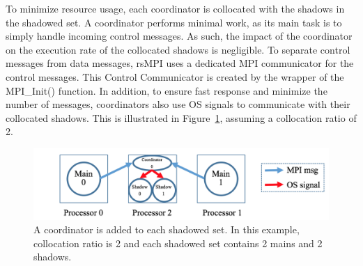 To minimize resource usage, each coordinator is collocated with the shadows in the shadowed set. 
A coordinator performs  minimal work, as its main task is to simply handle incoming control messages.  As such, the impact of the coordinator on the execution rate of the collocated shadows is negligible. To separate control messages from data messages, rsMPI uses a dedicated MPI communicator for the control messages. This Control Communicator is created by the wrapper of the MPI\_Init() function. In addition, to ensure fast response and minimize the number of messages, coordinators also use OS signals to communicate with their collocated shadows. This is illustrated in Figure~\ref{fig:coordinator}, assuming a collocation ratio of 2.


\begin{figure}[!t]
  \begin{center}
      \includegraphics[width=\columnwidth]{Figures/coordinator}
  \end{center}
  \caption{A coordinator is added to each shadowed set. In this example, collocation ratio is 2 and each shadowed set contains 2 mains and 2 shadows.}
  \label{fig:coordinator}
\end{figure}



